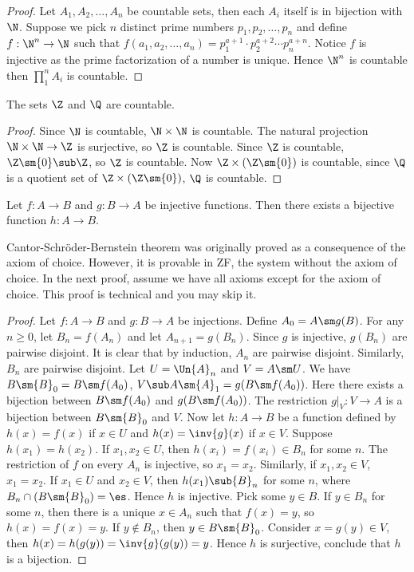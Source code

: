 \documentclass[10pt]{article}
\begin{document}
\begin{proof}
    Let ${A}_{1},{A}_{2},\dots,{A}_{n}$ be countable sets, then each ${A}_{i}$ itself is in bijection with $\N$. Suppose we pick $n$ distinct prime numbers ${p}_{1},{p}_{2},\dots,{p}_{n}$ and define $f:{\N}^{n}\to\N$ such that $f({a}_{1},{a}_{2},\dots,{a}_{n})={p}_{1}^{a+1}\cdot{p}_{2}^{a+2}\cdots{p}_{n}^{a+n}$. Notice $f$ is injective as the prime factorization of a number is unique. Hence ${\N}^{n}$ is countable then ${\prod}_{1}^{n}{A}_{i}$ is countable.
\end{proof}
\begin{proposition} 
    The sets $\Z$ and $\Q$ are countable.
\end{proposition}
\begin{proof}
    Since $\N$ is countable, $\N\times\N$ is countable. The natural projection $\N\times\N\to\Z$ is surjective, so $\Z$ is countable. Since $\Z$ is countable, $\Z\sm\{0\}\sub\Z$, so $\Z$ is countable. Now $\Z\times(\Z\sm\{0\})$ is countable, since $\Q$ is a quotient set of $\Z\times(\Z\sm\{0\})$, $\Q$ is countable.
\end{proof}
\begin{theorem}
    Let $f:A\to B$ and $g:B\to A$ be injective functions. Then there exists a bijective function $h:A\to B$.
\end{theorem}
\begin{remark}
    Cantor-Schröder-Bernstein theorem was originally proved as a consequence of the axiom of choice. However, it is provable in ZF, the system without the axiom of choice. In the next proof, assume we have all axioms except for the axiom of choice. This proof is technical and you may skip it.
\end{remark}
\begin{proof}
    Let $f:A\to B$ and $g:B\to A$ be injections. Define ${A}_{0}=A\sm g(B)$. For any $n\ge 0$, let ${B}_{n}=f({A}_{n})$ and let ${A}_{n+1}=g({B}_{n})$. Since $g$ is injective, $g({B}_{n})$ are pairwise disjoint. It is clear that by induction, ${A}_{n}$ are pairwise disjoint. Similarly, ${B}_{n}$ are pairwise disjoint. Let $U=\Un{A}_{n}$ and $V=A\sm U$. We have $B\sm{B}_{0}=B\sm f({A}_{0})$, $V\sub A\sm{A}_{1}=g(B\sm f({A}_{0}))$. Here there exists a bijection between $B\sm f({A}_{0})$ and $g(B\sm f({A}_{0}))$. The restriction $g{\vert}_{V}:V\to A$ is a bijection between $B\sm{B}_{0}$ and $V$. Now let $h:A\to B$ be a function defined by $h(x)=f(x)$ if $x\in U$ and $h(x)=\inv{g}(x)$ if $x\in V$. Suppose $h({x}_{1})=h({x}_{2})$. If ${x}_{1},{x}_{2}\in U$, then $h({x}_{i})=f({x}_{i})\in{B}_{n}$ for some $n$. The restriction of $f$ on every ${A}_{n}$ is injective, so ${x}_{1}={x}_{2}$. Similarly, if ${x}_{1},{x}_{2}\in V$, ${x}_{1}={x}_{2}$. If ${x}_{1}\in U$ and ${x}_{2}\in V$, then $h({x}_{1})\sub{B}_{n}$ for some $n$, where ${B}_{n}\cap(B\sm{B}_{0})=\es$. Hence $h$ is injective. Pick some $y\in B$. If $y\in{B}_{n}$ for some $n$, then there is a unique $x\in{A}_{n}$ such that $f(x)=y$, so $h(x)=f(x)=y$. If $y\notin{B}_{n}$, then $y\in B\sm{B}_{0}$. Consider $x=g(y)\in V$, then $h(x)=h(g(y))=\inv{g}(g(y))=y$. Hence $h$ is surjective, conclude that $h$ is a bijection.
\end{proof}
\end{document}
